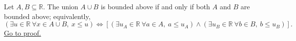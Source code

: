\begin{proposition}
\label{prop:union-bounded-above-iff-pieces-bounded-above}
Let $A,B\subseteq\mathbb{R}$. The union $A\cup B$ is bounded above if and
only if both $A$ and $B$ are bounded above; equivalently,
\[
\left(\exists u\in\mathbb{R}\ \forall x\in A\cup B,\ x\leq u\right)
\Longleftrightarrow
\left[
\left(\exists u_A\in\mathbb{R}\ \forall a\in A,\ a\leq u_A\right)
\land
\left(\exists u_B\in\mathbb{R}\ \forall b\in B,\ b\leq u_B\right)
\right].
\]
\hyperref[prf:union-bounded-above-iff-pieces-bounded-above]{Go to proof.}
\end{proposition}